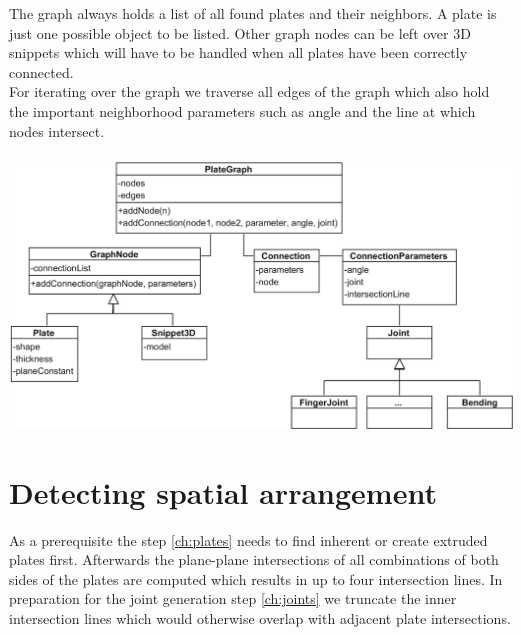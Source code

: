 \documentclass[../ClassicThesis.tex]{subfiles}
\begin{document}
The graph always holds a list of all found plates and their neighbors. A plate is just one possible object to be listed. Other graph nodes can be left over 3D snippets which will have to be handled when all plates have been correctly connected.\\
For iterating over the graph we traverse all edges of the graph which also hold the important neighborhood parameters such as angle and the line at which nodes intersect.\\\* \\
\hspace*{-1.8cm}
\includegraphics[width=1.3\columnwidth]{Images/GraphStructure.png}


\section{Detecting spatial arrangement}
As a prerequisite the step \ref{ch:plates} needs to find inherent or create extruded plates first. Afterwards the plane-plane intersections of all combinations of both sides of the plates are computed which results in up to four intersection lines. In preparation for the joint generation step \ref{ch:joints} we truncate the inner intersection lines which would otherwise overlap with adjacent plate intersections.
\end{document}
